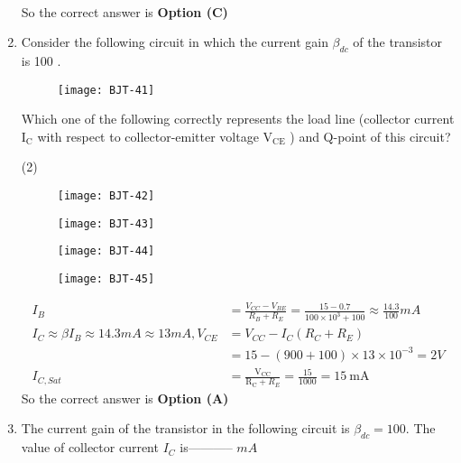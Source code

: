 \begin{enumerate}
\begin{answer}
\begin{align*}
\end{align*}
So the correct answer is \textbf{Option (C)}
\end{answer}
	\item Consider the following circuit in which the current gain $\beta_{d c}$ of the transistor is 100 .\\
	\begin{figure}[H]
		\centering
		\texttt{[image: BJT-41]}
	\end{figure}
	Which one of the following correctly represents the load line (collector current $\mathrm{I}_{\mathrm{C}}$ with respect to collector-emitter voltage $\mathrm{V}_{\mathrm{CE}}$ ) and Q-point of this circuit?
{	}
\begin{tasks}(2)
\task[\textbf{A.}]\begin{figure}[H]
	\centering
	\texttt{[image: BJT-42]}
\end{figure}
\task[\textbf{B.}] \begin{figure}[H]
	\centering
	\texttt{[image: BJT-43]}
\end{figure}
\task[\textbf{C.}] \begin{figure}[H]
	\centering
	\texttt{[image: BJT-44]}
\end{figure}
\task[\textbf{D.}] \begin{figure}[H]
	\centering
	\texttt{[image: BJT-45]}
\end{figure}
\end{tasks}
\begin{answer}
\begin{align*}
I_{B}&=\frac{V_{C C}-V_{B E}}{R_{B}+R_{E}}=\frac{15-0.7}{100 \times 10^{3}+100} \approx \frac{14.3}{100} m A\\
I_{C} \approx \beta I_{B} \approx 14.3 m A \approx 13 m A, V_{C E}&=V_{C C}-I_{C}\left(R_{C}+R_{E}\right)\\&=15-(900+100) \times 13 \times 10^{-3}=2 V\\
I_{C, S a t}&=\frac{\mathrm{V}_{\mathrm{CC}}}{\mathrm{R}_{\mathrm{C}}+R_{E}}=\frac{15}{1000}=15 \mathrm{~mA}
\end{align*}
So the correct answer is \textbf{Option (A)}
\end{answer}
	\item The current gain of the transistor in the following circuit is $\beta_{d c}=100$. The value of collector current $I_{C}$ is----------- $m A$
{	}
\begin{figure}[H]

\end{figure}
\end{enumerate}
